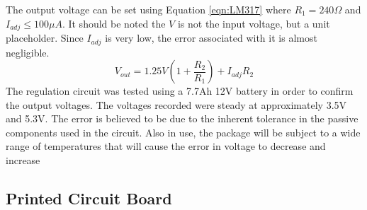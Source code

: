The output voltage can be set using Equation \ref{eqn:LM317} where $R_1= 240\Omega$ and $I_{adj}\le 100\mu A$.
It should be noted the $V$ is not the input voltage, but a unit placeholder.
Since $I_{adj}$ is very low, the error associated with it is almost negligible. 
\begin{equation}
V_{out} = 1.25V(1+\frac{R_2}{R_1}) + I_{adj}R_2
\label{eqn:LM317}
\end{equation}
The regulation circuit was tested using a 7.7Ah 12V battery in order to confirm the output voltages. %
The voltages recorded were steady at approximately 3.5V and 5.3V.
The error is believed to be due to the inherent tolerance in the passive components used in the circuit.
Also in use, the package will be subject to a wide range of temperatures that will cause the error in voltage to decrease and increase


\subsection{Printed Circuit Board}